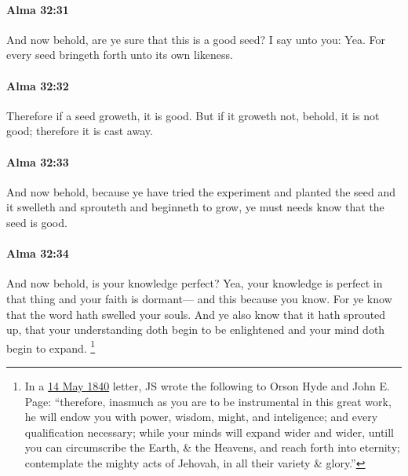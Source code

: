 		\paragraph{Alma 32:31} %
			\label{ALMA-32-31}

			And now behold, are ye sure that this is a good seed?
			I say unto you: Yea.
			For every seed bringeth forth unto its own likeness.

		\paragraph{Alma 32:32} %
			\label{ALMA-32-32}

			Therefore if a seed groweth, it is good.
			But if it groweth not, behold, it is not good;
			therefore it is cast away.

		\paragraph{Alma 32:33} %
			\label{ALMA-32-33}

			And now behold, because ye have tried the experiment and planted the seed
			and it swelleth and sprouteth and beginneth to grow,
			ye must needs know that the seed is good.

		\paragraph{Alma 32:34} %
			\label{ALMA-32-34}

			And now behold, is your knowledge perfect?
			Yea, your knowledge is perfect in that thing and your faith is dormant---
			and this because you know.
			For ye know that the word hath swelled your souls.
			And ye also know that it hath sprouted up,
			that your understanding doth begin to be enlightened
			and your mind doth begin to expand.%
				\footnote{%
					In a \hyperref[EMS-1840-JS-14-MAY-1840]{14 May 1840} letter, JS wrote the following to Orson Hyde and John E. Page: ``therefore, inasmuch as you are to be instrumental in this great work, he will endow you with power, wisdom, might, and inteligence; and every qualification necessary; while your minds will expand wider and wider, untill you can circumscribe the Earth, \& the Heavens, and reach forth into eternity; contemplate the mighty acts of Jehovah, in all their variety \& glory.''
					}


